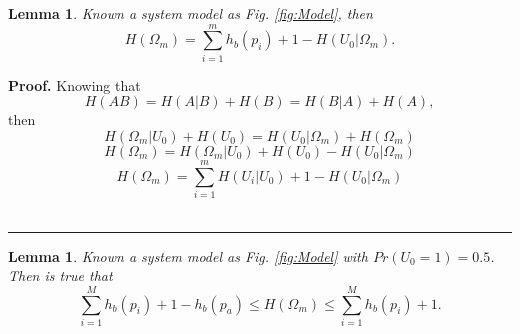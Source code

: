 \documentclass[a4paper,10pt]{article}
\newtheorem{mylemma}[mytheorem]{Lemma}
\newenvironment{myproof}[1][Proof]{\textbf{#1.} }{\ \rule{0.5em}{0.5em}}
\begin{document}
\begin{mdframed}[style=MDFStyGrayScreen]
\begin{mylemma}
 \label{lemm:H}
 Known a system model as Fig. \ref{fig:Model}, then
  \begin{equation}\label{eq:H}
H(\Omega_m) = \sum_{i=1}^{m}{h_b(p_i)}+1-H(U_0|\Omega_m).
\end{equation}
\end{mylemma}
\end{mdframed}

\begin{myproof}
 \label{proof:H}
 Knowing that
 \begin{equation}\label{eq:H1}
H(A B)=H(A|B)+H(B)=H(B|A)+H(A),
\end{equation}
then
 \begin{equation}\label{eq:H2}
H(\Omega_m|U_0)+H(U_0)=H(U_0|\Omega_m)+H(\Omega_m)
\end{equation}
 \begin{equation}\label{eq:H3}
H(\Omega_m) = H(\Omega_m|U_0)+H(U_0)-H(U_0|\Omega_m)
\end{equation}
 \begin{equation}\label{eq:H4}
H(\Omega_m) = \sum_{i=1}^{m}{H(U_i|U_0)}+1-H(U_0|\Omega_m)
\end{equation}
\end{myproof}
\begin{mdframed}[style=MDFStyGrayScreen]
\begin{mylemma}
 \label{lemm:Hin}
 Known a system model as Fig. \ref{fig:Model} with $Pr(U_0=1)=0.5$. Then is true that
  \begin{equation}\label{eq:Hin}
\sum_{i=1}^{M}{h_b(p_i)}+1-h_b(p_a) \leq H(\Omega_m) \leq \sum_{i=1}^{M}{h_b(p_i)}+1.
\end{equation}
\end{mylemma}
\end{mdframed}
\end{document}
